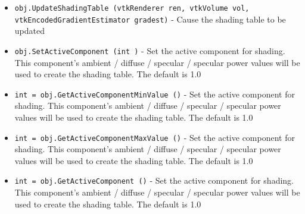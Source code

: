 \begin{itemize}
\item  \verb|obj.UpdateShadingTable (vtkRenderer ren, vtkVolume vol, vtkEncodedGradientEstimator gradest)| -  Cause the shading table to be updated

\item  \verb|obj.SetActiveComponent (int )| -  Set the active component for shading. This component's 
 ambient / diffuse / specular / specular power values will
 be used to create the shading table. The default is 1.0

\item  \verb|int = obj.GetActiveComponentMinValue ()| -  Set the active component for shading. This component's 
 ambient / diffuse / specular / specular power values will
 be used to create the shading table. The default is 1.0

\item  \verb|int = obj.GetActiveComponentMaxValue ()| -  Set the active component for shading. This component's 
 ambient / diffuse / specular / specular power values will
 be used to create the shading table. The default is 1.0

\item  \verb|int = obj.GetActiveComponent ()| -  Set the active component for shading. This component's 
 ambient / diffuse / specular / specular power values will
 be used to create the shading table. The default is 1.0

\end{itemize}
